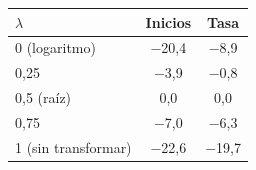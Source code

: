 \begin{tabular}{lcc}
\toprule
$\lambda$ & Inicios & Tasa
\\ \midrule
0 (logaritmo) & \ensuremath{-}20{,}4 & \ensuremath{-}8{,}9 \\
0,25 & \ensuremath{-}3{,}9 & \ensuremath{-}0{,}8 \\
0,5 (ra\'iz) & 0{,}0 & 0{,}0 \\
0,75 & \ensuremath{-}7{,}0 & \ensuremath{-}6{,}3 \\
1 (sin transformar) & \ensuremath{-}22{,}6 & \ensuremath{-}19{,}7 \\
\bottomrule
\end{tabular}
